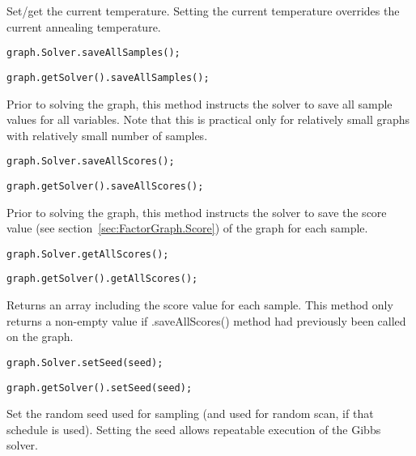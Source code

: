 Set/get the current temperature. Setting the current temperature overrides the current annealing temperature.

\ifmatlab
\begin{lstlisting}
graph.Solver.saveAllSamples();
\end{lstlisting}
\fi

\ifjava
\begin{lstlisting}
graph.getSolver().saveAllSamples();
\end{lstlisting}
\fi

Prior to solving the graph, this method instructs the solver to save all sample values for all variables. Note that this is practical only for relatively small graphs with relatively small number of samples.

\ifmatlab
\begin{lstlisting}
graph.Solver.saveAllScores();
\end{lstlisting}
\fi

\ifjava
\begin{lstlisting}
graph.getSolver().saveAllScores();
\end{lstlisting}
\fi

Prior to solving the graph, this method instructs the solver to save the score value (see section~\ref{sec:FactorGraph.Score}) of the graph for each sample.

\ifmatlab
\begin{lstlisting}
graph.Solver.getAllScores();
\end{lstlisting}
\fi

\ifjava
\begin{lstlisting}
graph.getSolver().getAllScores();
\end{lstlisting}
\fi

Returns an array including the score value for each sample. This method only returns a non-empty value if .saveAllScores() method had previously been called on the graph.

\ifmatlab
\begin{lstlisting}
graph.Solver.setSeed(seed);
\end{lstlisting}
\fi

\ifjava
\begin{lstlisting}
graph.getSolver().setSeed(seed);
\end{lstlisting}
\fi

Set the random seed used for sampling (and used for random scan, if that schedule is used). Setting the seed allows repeatable execution of the Gibbs solver.

